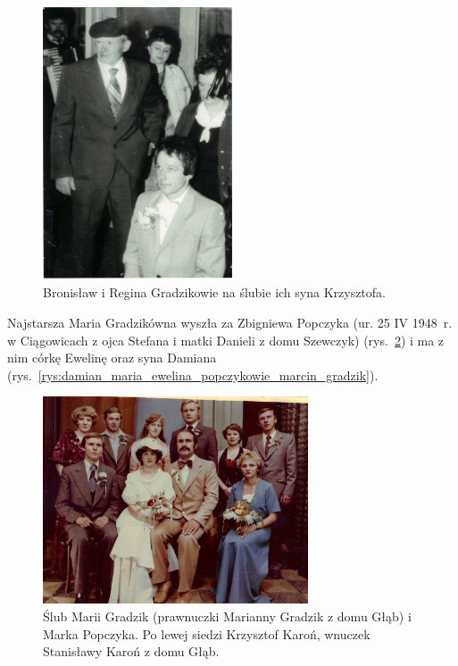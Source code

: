 \begin{figure}[!h]
\begin{center}
\includegraphics[width=0.5\textwidth]{zdjecia/bronislaw_regina_krzysztof_gradzikowie.jpg}
\caption{Bronisław i Regina Gradzikowie na ślubie ich syna Krzysztofa.}
\label{rys:bronislaw_regina_krzysztof_gradzikowie}
\end{center}
\end{figure}

Najstarsza Maria Gradzikówna wyszła za Zbigniewa Popczyka (ur. 25 IV 1948~r. w Ciągowicach z ojca Stefana i matki Danieli z domu Szewczyk) (rys.~\ref{rys:slub_marii_gradzik_i_marka_popczyka}) i ma z nim córkę Ewelinę oraz syna Damiana (rys.~\ref{rys:damian_maria_ewelina_popczykowie_marcin_gradzik}).

\begin{figure}[!h]
\begin{center}
\includegraphics[width=0.7\textwidth]{zdjecia/slub_marii_gradzik_i_marka_popczyka.jpg}
\caption[Ślub Marii Gradzik i Marka Popczyka]{Ślub Marii Gradzik (prawnuczki Marianny Gradzik z domu Głąb) i Marka Popczyka. Po lewej siedzi Krzysztof Karoń, wnuczek Stanisławy Karoń z domu Głąb.}
\label{rys:slub_marii_gradzik_i_marka_popczyka}
\end{center}
\end{figure}

